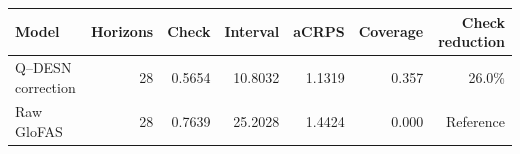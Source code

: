 \small
\begin{tabular}{lrrrrrr}
\toprule
Model & Horizons & Check & Interval & aCRPS & Coverage & Check reduction \\
\midrule
Q--DESN correction & 28 & 0.5654 & 10.8032 & 1.1319 & 0.357 & 26.0\% \\
Raw GloFAS & 28 & 0.7639 & 25.2028 & 1.4424 & 0.000 & Reference \\
\bottomrule
\end{tabular}
